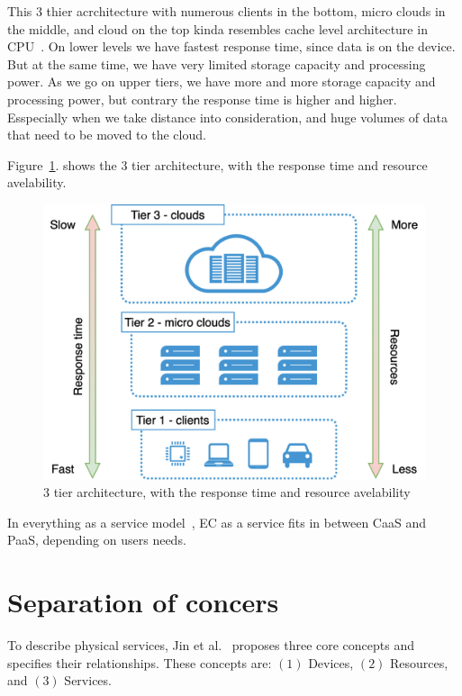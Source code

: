 This 3 thier acrchitecture with numerous clients in the bottom, micro clouds in the middle, and cloud on the top kinda resembles cache level architecture in CPU~\cite{FarshinRMK19}. On lower levels we have fastest response time, since data is on the device. But at the same time, we have very limited storage capacity and processing power. As we go on upper tiers, we have more and more storage capacity and processing power, but contrary the response time is higher and higher.  Esspecially when we take distance into consideration, and huge volumes of data that need to be moved to the cloud.

Figure~\ref{fig:fig9}. shows the 3 tier architecture, with the response time and resource avelability.

\begin{figure}[H]
	\includegraphics[width=\linewidth]{images/Figure9}
	\vspace{-0.7cm}
	\caption{3 tier architecture, with the response time and resource avelability}
	\label{fig:fig9}
\end{figure}

In everything as a service model~\cite{DuanFZSNH15}, EC as a service fits in between CaaS and PaaS, depending on users needs. 
%
%
\section{Separation of concers}\label{sec:separation_of_concerns}
%
To describe physical services, Jin et al.~\cite{JinCJL14} proposes three core concepts and specifies their relationships. These concepts are: $(1)$ Devices, $(2)$ Resources, and $(3)$ Services. 

